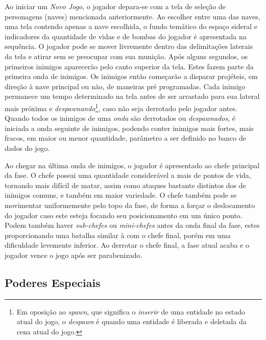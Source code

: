 Ao iniciar um \textit{Novo Jogo}, o jogador depara-se com a tela de seleção de personagens (naves) mencionada anteriormente. Ao escolher entre uma das naves, uma tela contendo apenas a nave escolhida, o fundo temático do espaço sideral e indicadores da quantidade de vidas e de bombas do jogador é apresentada na sequência. O jogador pode se mover livremente dentro das delimitações laterais da tela e atirar sem se preocupar com sua munição. Após alguns segundos, os primeiros inimigos aparecerão pelo canto superior da tela. Estes fazem parte da primeira onda de inimigos. Os inimigos então começarão a disparar projéteis, em direção à nave principal ou não, de maneiras pré programadas. Cada inimigo permanece um tempo determinado na tela antes de ser arrastado para sua lateral mais próxima e \textit{despawnando}\footnote{
    Em oposição ao \textit{spawn}, que significa o \textit{inserir} de uma entidade no estado atual do jogo, o \textit{despawn} é quando uma entidade é liberada e deletada da cena atual do jogo.
}, caso não seja derrotado pelo jogador antes. Quando todos os inimigos de uma \textit{onda} são derrotados ou \textit{despawnados}, é iniciada a onda seguinte de inimigos, podendo conter inimigos mais fortes, mais fracos, em maior ou menor quantidade, parâmetro a ser definido no banco de dados do jogo.

Ao chegar na última onda de inimigos, o jogador é apresentado ao chefe principal da fase. O chefe possui uma quantidade considerável a mais de pontos de vida, tornando mais difícil de matar, assim como ataques bastante distintos dos de inimigos comuns, e também em maior variedade. O chefe também pode se movimentar uniformemente pelo topo da fase, de forma a forçar o deslocamento do jogador caso este esteja focando seu posicionamento em um único ponto. Podem também haver \textit{sub-chefes} ou \textit{mini-chefes} antes da onda final da fase, estes proporcionando uma batalha similar à com o chefe final, porém em uma dificuldade levemente inferior. Ao derrotar o chefe final, a fase atual acaba e o jogador vence o jogo após ser parabenizado.

\subsection{Poderes Especiais}

